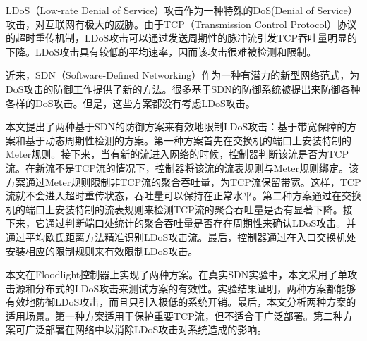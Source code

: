 \begin{cabstract}
  LDoS（Low-rate Denial of Service）攻击作为一种特殊的DoS(Denial of Service）攻击，对互联网有极大的威胁。由于TCP（Transmission Control Protocol）协议的超时重传机制，LDoS攻击可以通过发送周期性的脉冲流引发TCP吞吐量明显的下降。LDoS攻击具有较低的平均速率，因而该攻击很难被检测和限制。

  近来，SDN（Software-Defined Networking）作为一种有潜力的新型网络范式，为DoS攻击的防御工作提供了新的方法。很多基于SDN的防御系统被提出来防御各种各样的DoS攻击。但是，这些方案都没有考虑LDoS攻击。

  本文提出了两种基于SDN的防御方案来有效地限制LDoS攻击：基于带宽保障的方案和基于动态周期性检测的方案。第一种方案首先在交换机的端口上安装特制的Meter规则。接下来，当有新的流进入网络的时候，控制器判断该流是否为TCP流。在新流不是TCP流的情况下，控制器将该流的流表规则与Meter规则绑定。该方案通过Meter规则限制非TCP流的聚合吞吐量，为TCP流保留带宽。这样，TCP流就不会进入超时重传状态，吞吐量可以保持在正常水平。第二种方案通过在交换机的端口上安装特制的流表规则来检测TCP流的聚合吞吐量是否有显著下降。接下来，它通过判断端口处统计的聚合吞吐量是否存在周期性来确认LDoS攻击。并通过平均欧氏距离方法精准识别LDoS攻击流。最后，控制器通过在入口交换机处安装相应的限制规则来有效限制LDoS攻击。

  本文在Floodlight控制器上实现了两种方案。在真实SDN实验中，本文采用了单攻击源和分布式的LDoS攻击来测试方案的有效性。实验结果证明，两种方案都能够有效地防御LDoS攻击，而且只引入极低的系统开销。最后，本文分析两种方案的适用场景。第一种方案适用于保护重要TCP流，但不适合于广泛部署。第二种方案可广泛部署在网络中以消除LDoS攻击对系统造成的影响。

\end{cabstract}


